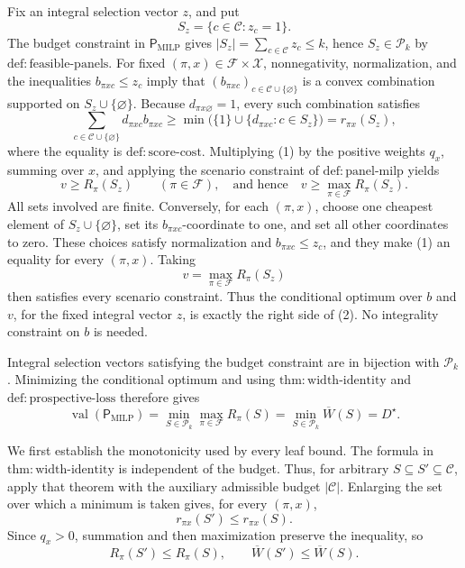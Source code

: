Fix an integral selection vector \(z\), and put
\[
S_z=\{c\in\mathcal C:z_c=1\}.
\]
The budget constraint in \(\mathsf P_{\mathrm{MILP}}\) gives
\(|S_z|=\sum_{c\in\mathcal C}z_c\leq k\), hence
\(S_z\in\mathcal P_k\) by \(\mathrm{def{:}feasible\text{-}panels}\).
For fixed \((\pi,x)\in\mathcal F\times\mathcal X\), nonnegativity,
normalization, and the inequalities \(b_{\pi xc}\leq z_c\) imply that
\((b_{\pi xc})_{c\in\mathcal C\cup\{\varnothing\}}\) is a convex
combination supported on \(S_z\cup\{\varnothing\}\).  Because
\(d_{\pi x\varnothing}=1\), every such combination satisfies
\[
\sum_{c\in\mathcal C\cup\{\varnothing\}}
d_{\pi xc}b_{\pi xc}
\geq
\min\bigl(\{1\}\cup\{d_{\pi xc}:c\in S_z\}\bigr)
=r_{\pi x}(S_z),                                                    \tag{1}
\]
where the equality is \(\mathrm{def{:}score\text{-}cost}\).  Multiplying
(1) by the positive weights \(q_x\), summing over \(x\), and applying the
scenario constraint of \(\mathrm{def{:}panel\text{-}milp}\) yields
\[
v\geq R_\pi(S_z)\qquad(\pi\in\mathcal F),
\quad\text{and hence}\quad
v\geq\max_{\pi\in\mathcal F}R_\pi(S_z).                              \tag{2}
\]
All sets involved are finite.  Conversely, for each \((\pi,x)\), choose
one cheapest element of \(S_z\cup\{\varnothing\}\), set its
\(b_{\pi xc}\)-coordinate to one, and set all other coordinates to zero.
These choices satisfy normalization and \(b_{\pi xc}\leq z_c\), and they
make (1) an equality for every \((\pi,x)\).  Taking
\[
v=\max_{\pi\in\mathcal F}R_\pi(S_z)
\]
then satisfies every scenario constraint.  Thus the conditional optimum
over \(b\) and \(v\), for the fixed integral vector \(z\), is exactly the
right side of (2).  No integrality constraint on \(b\) is needed.

Integral selection vectors satisfying the budget constraint are in
bijection with \(\mathcal P_k\).  Minimizing the conditional optimum and
using \(\mathrm{thm{:}width\text{-}identity}\) and
\(\mathrm{def{:}prospective\text{-}loss}\) therefore gives
\[
\operatorname{val}(\mathsf P_{\mathrm{MILP}})
=\min_{S\in\mathcal P_k}\max_{\pi\in\mathcal F}R_\pi(S)
=\min_{S\in\mathcal P_k}\overline W(S)
=D^\star.
\]

We first establish the monotonicity used by every leaf bound.  The formula
in \(\mathrm{thm{:}width\text{-}identity}\) is independent of the budget.
Thus, for arbitrary \(S\subseteq S'\subseteq\mathcal C\), apply that theorem
with the auxiliary admissible budget \(|\mathcal C|\).  Enlarging the set
over which a minimum is taken gives, for every \((\pi,x)\),
\[
r_{\pi x}(S')\leq r_{\pi x}(S).
\]
Since \(q_x>0\), summation and then maximization preserve the inequality, so
\[
R_\pi(S')\leq R_\pi(S),
\qquad
\overline W(S')\leq\overline W(S).                                    \tag{3}
\]

